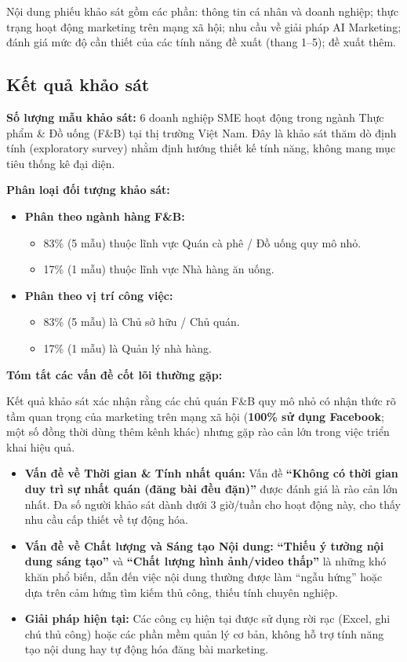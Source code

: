 Nội dung phiếu khảo sát gồm các phần: thông tin cá nhân và doanh nghiệp;
thực trạng hoạt động marketing trên mạng xã hội; nhu cầu về giải pháp
AI Marketing; đánh giá mức độ cần thiết của các tính năng đề xuất (thang
1--5); đề xuất thêm.

\subsection{Kết quả khảo sát}

\textbf{Số lượng mẫu khảo sát:} 6 doanh nghiệp SME hoạt động trong ngành
Thực phẩm \& Đồ uống (F\&B) tại thị trường Việt Nam. Đây là khảo sát
thăm dò định tính (exploratory survey) nhằm định hướng thiết kế tính năng,
không mang mục tiêu thống kê đại diện.

\textbf{Phân loại đối tượng khảo sát:}

\begin{itemize}
\item
  \textbf{Phân theo ngành hàng F\&B:}

  \begin{itemize}
  \item
    83\% (5 mẫu) thuộc lĩnh vực Quán cà phê / Đồ uống quy mô nhỏ.
  \item
    17\% (1 mẫu) thuộc lĩnh vực Nhà hàng ăn uống.
  \end{itemize}
\item
  \textbf{Phân theo vị trí công việc:}

  \begin{itemize}
  \item
    83\% (5 mẫu) là Chủ sở hữu / Chủ quán.
  \item
    17\% (1 mẫu) là Quản lý nhà hàng.
  \end{itemize}
\end{itemize}

\textbf{Tóm tắt các vấn đề cốt lõi thường gặp:}

Kết quả khảo sát xác nhận rằng các chủ quán F\&B quy mô nhỏ có nhận thức
rõ tầm quan trọng của marketing trên mạng xã hội (\textbf{100\% sử dụng
Facebook}; một số đồng thời dùng thêm kênh khác) nhưng gặp rào cản lớn
trong việc triển khai hiệu quả.

\begin{itemize}
\item
  \textbf{Vấn đề về Thời gian \& Tính nhất quán:} Vấn đề \textbf{``Không
  có thời gian duy trì sự nhất quán (đăng bài đều đặn)''} được đánh giá
  là rào cản lớn nhất. Đa số người khảo sát dành dưới 3 giờ/tuần cho
  hoạt động này, cho thấy nhu cầu cấp thiết về tự động hóa.
\item
  \textbf{Vấn đề về Chất lượng và Sáng tạo Nội dung:} \textbf{``Thiếu ý
  tưởng nội dung sáng tạo''} và \textbf{``Chất lượng hình ảnh/video thấp''}
  là những khó khăn phổ biến, dẫn đến việc nội dung thường được làm
  ``ngẫu hứng'' hoặc dựa trên cảm hứng tìm kiếm thủ công, thiếu tính
  chuyên nghiệp.
\item
  \textbf{Giải pháp hiện tại:} Các công cụ hiện tại được sử dụng rời rạc
  (Excel, ghi chú thủ công) hoặc các phần mềm quản lý cơ bản, không hỗ
  trợ tính năng tạo nội dung hay tự động hóa đăng bài marketing.
\end{itemize}

